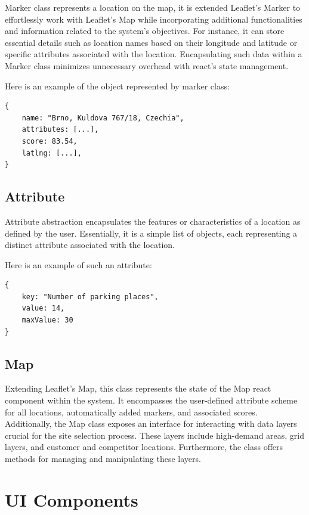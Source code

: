Marker class represents a location on the map, it is extended Leaflet's Marker to effortlessly work with Leaflet's Map while incorporating additional functionalities and information related to the system's objectives. For instance, it can store essential details such as location names based on their longitude and latitude or specific attributes associated with the location. Encapsulating such data within a Marker class minimizes unnecessary overhead with react's state management.

Here is an example of the object represented by marker class:

\begin{verbatim}
{
    name: "Brno, Kuldova 767/18, Czechia",
    attributes: [...],
    score: 83.54,
    latlng: [...],
}
\end{verbatim}

\subsection{Attribute}

Attribute abstraction encapsulates the features or characteristics of a location as defined by the user. Essentially, it is a simple list of objects, each representing a distinct attribute associated with the location.

Here is an example of such an attribute:

\begin{verbatim}
{ 
    key: "Number of parking places", 
    value: 14, 
    maxValue: 30 
}
\end{verbatim}

\subsection{Map}
\label{subsec:extendedMap}

Extending Leaflet's Map, this class represents the state of the Map react component within the system. It encompasses the user-defined attribute scheme for all locations, automatically added markers, and associated scores. Additionally, the Map class exposes an interface for interacting with data layers crucial for the site selection process. These layers include high-demand areas, grid layers, and customer and competitor locations. Furthermore, the class offers methods for managing and manipulating these layers.

\section{UI Components}

